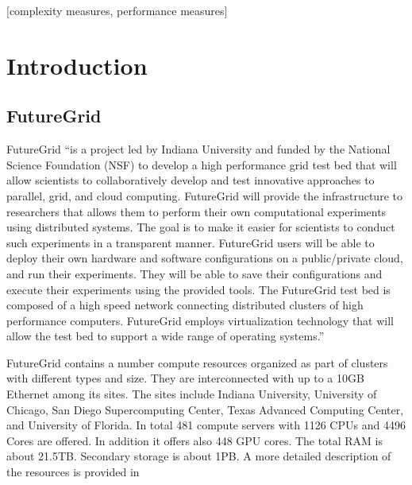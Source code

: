 \documentclass{tex/sig-alternate-2013}
\begin{document}
[complexity measures, performance measures] 
 
 
 

\section{Introduction}

\subsection{FutureGrid}



FutureGrid \cite{las2010gce,las12fg-bookchapter} ``is a project led by
Indiana University and funded by the National Science Foundation (NSF)
to develop a high performance grid test bed that will allow scientists
to collaboratively develop and test innovative approaches to parallel,
grid, and cloud computing. FutureGrid will provide the infrastructure
to researchers that allows them to perform their own computational
experiments using distributed systems. The goal is to make it easier
for scientists to conduct such experiments in a transparent manner.
FutureGrid users will be able to deploy their own hardware and
software configurations on a public/private cloud, and run their
experiments. They will be able to save their configurations and
execute their experiments using the provided tools. The FutureGrid
test bed is composed of a high speed network connecting distributed
clusters of high performance computers. FutureGrid employs
virtualization technology that will allow the test bed to support a
wide range of operating systems.''



FutureGrid contains a number compute resources organized as part of
clusters with different types and size. They are interconnected with up to a 10GB Ethernet among its sites. The sites include Indiana University, University of Chicago, San Diego Supercomputing Center, Texas Advanced Computing Center, and University of Florida.
In total 481 compute servers with 1126 CPUs and 4496 Cores are
offered. In addition it offers also 448 GPU cores. The total RAM is
about 21.5TB. Secondary storage is about 1PB. A more detailed
description of the resources is provided in
\cite{vonLaszewski-bigdata-bookchapter2014}
\end{document}
